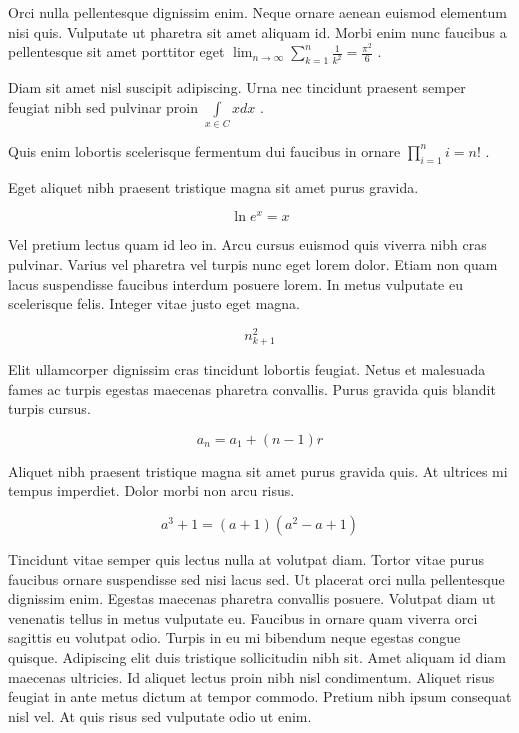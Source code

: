 \documentclass{article}
\begin{document}
	
    Orci nulla pellentesque dignissim enim. Neque ornare aenean euismod elementum nisi quis. Vulputate ut pharetra sit amet aliquam id. Morbi enim nunc faucibus a pellentesque sit amet porttitor eget  
    \begin{math}
    	\lim_{n \to \infty}\sum_{k=1}^n \frac{1}{k^2}= \frac{\pi^2}{6}
    \end{math}
    .
    \newline
    
   Diam sit amet nisl suscipit adipiscing. Urna nec tincidunt praesent semper feugiat nibh sed pulvinar proin 
   $ \int\limits_{x\in C}xdx $
   .
   \newline
    
    Quis enim lobortis scelerisque fermentum dui faucibus in ornare 
    \( \prod_{i=1}^ni=n! \)
    .
    \newline
    
    Eget aliquet nibh praesent tristique magna sit amet purus gravida.
    
    \[ \ln e^x = x  \]
    
    Vel pretium lectus quam id leo in. Arcu cursus euismod quis viverra nibh cras pulvinar. Varius vel pharetra vel turpis nunc eget lorem dolor. Etiam non quam lacus suspendisse faucibus interdum posuere lorem. In metus vulputate eu scelerisque felis. Integer vitae justo eget magna.
    
    $$ n_{k+1}^2 $$
    
    Elit ullamcorper dignissim cras tincidunt lobortis feugiat. Netus et malesuada fames ac turpis egestas maecenas pharetra convallis. Purus gravida quis blandit turpis cursus. 
    
    \begin{displaymath}
    	a_{n}=a_{1}+(n-1)r
    \end{displaymath}
    
    Aliquet nibh praesent tristique magna sit amet purus gravida quis. At ultrices mi tempus imperdiet. Dolor morbi non arcu risus.
    
    \begin{equation}
    	a^{3}+1=(a+1)(a^{2}-a+1)
    \end{equation}
    
    Tincidunt vitae semper quis lectus nulla at volutpat diam. Tortor vitae purus faucibus ornare suspendisse sed nisi lacus sed. Ut placerat orci nulla pellentesque dignissim enim. Egestas maecenas pharetra convallis posuere. Volutpat diam ut venenatis tellus in metus vulputate eu. Faucibus in ornare quam viverra orci sagittis eu volutpat odio. Turpis in eu mi bibendum neque egestas congue quisque. Adipiscing elit duis tristique sollicitudin nibh sit. Amet aliquam id diam maecenas ultricies. Id aliquet lectus proin nibh nisl condimentum. Aliquet risus feugiat in ante metus dictum at tempor commodo. Pretium nibh ipsum consequat nisl vel. At quis risus sed vulputate odio ut enim.
    
\end{document}
